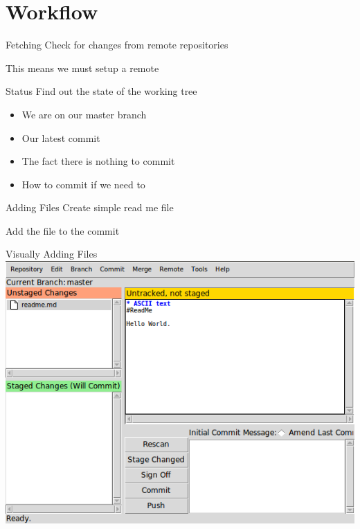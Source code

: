 \documentclass{beamer}
\begin{document}
  \section{Workflow}
  \begin{frame}[fragile=singleslide]{Fetching}
    Check for changes from remote repositories
    
    This means we must setup a remote
    
  \end{frame}
  \begin{frame}[fragile=singleslide]{Status}
    Find out the state of the working tree
    
    \begin{itemize}
      \item We are on our master branch
      \item Our latest commit
      \item The fact there is nothing to commit
      \item How to commit if we need to
    \end{itemize}
  \end{frame}
  \begin{frame}[fragile=singleslide]{Adding Files}
    Create simple read me file
    
    
  \end{frame}
  \begin{frame}[fragile=singleslide]
    Add the file to the commit
    
    
  \end{frame}
  \begin{frame}{Visually Adding Files}
    \centering
    \includegraphics[scale=0.4,keepaspectratio]{git-gui.png}
  \end{frame}
\end{document}
